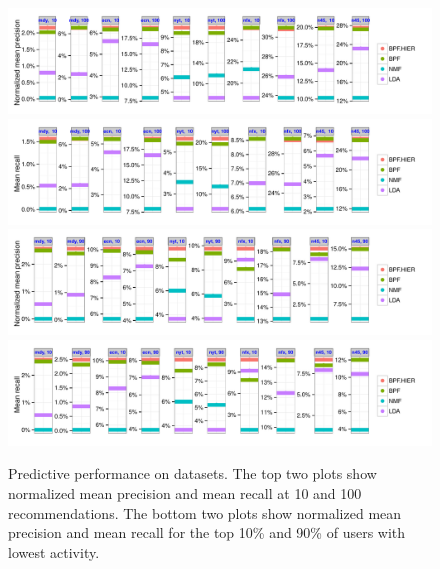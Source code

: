
\begin{figure}[t!]
\centering
\includegraphics[width=\textwidth]{./figures/meanprecision2.pdf}\\               
\includegraphics[width=\textwidth]{./figures/meanrecall2.pdf}\\               
\includegraphics[width=\textwidth]{./figures/useractivity-meanprecision2.pdf}\\
\includegraphics[width=\textwidth]{./figures/useractivity-meanrecall2.pdf}\\
\caption{Predictive performance on datasets. The top two plots show
  normalized mean precision and mean recall at 10 and 100
  recommendations. The bottom two plots show normalized mean precision
  and mean recall for the top 10\% and 90\% of users with lowest
  activity.}
\label{fig:precision_by_M}
\end{figure}


